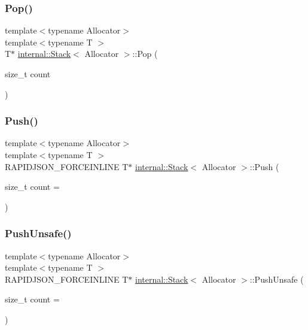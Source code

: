 \mbox{\label{classinternal_1_1Stack_a8545a8ccba595ac6e4ade9784474aa1c}} 
\subsubsection{\texorpdfstring{Pop()}{Pop()}}
{\footnotesize\ttfamily template$<$typename Allocator$>$ \\
template$<$typename T $>$ \\
T$\ast$ \hyperlink{classinternal_1_1Stack}{internal\+::\+Stack}$<$ Allocator $>$\+::Pop (\begin{DoxyParamCaption}\item[{size\+\_\+t}]{count }\end{DoxyParamCaption})\hspace{0.3cm}{\ttfamily [inline]}}

\mbox{\label{classinternal_1_1Stack_a8038223ec0ed6ea92bb5f48e645a25ca}} 
\subsubsection{\texorpdfstring{Push()}{Push()}}
{\footnotesize\ttfamily template$<$typename Allocator$>$ \\
template$<$typename T $>$ \\
R\+A\+P\+I\+D\+J\+S\+O\+N\+\_\+\+F\+O\+R\+C\+E\+I\+N\+L\+I\+NE T$\ast$ \hyperlink{classinternal_1_1Stack}{internal\+::\+Stack}$<$ Allocator $>$\+::Push (\begin{DoxyParamCaption}\item[{size\+\_\+t}]{count = {} }\end{DoxyParamCaption})\hspace{0.3cm}{\ttfamily [inline]}}

\mbox{\label{classinternal_1_1Stack_a63b4eabd209d4fc9b43027f4e5660532}} 
\subsubsection{\texorpdfstring{Push\+Unsafe()}{PushUnsafe()}}
{\footnotesize\ttfamily template$<$typename Allocator$>$ \\
template$<$typename T $>$ \\
R\+A\+P\+I\+D\+J\+S\+O\+N\+\_\+\+F\+O\+R\+C\+E\+I\+N\+L\+I\+NE T$\ast$ \hyperlink{classinternal_1_1Stack}{internal\+::\+Stack}$<$ Allocator $>$\+::Push\+Unsafe (\begin{DoxyParamCaption}\item[{size\+\_\+t}]{count = {} }\end{DoxyParamCaption})\hspace{0.3cm}{\ttfamily [inline]}}

